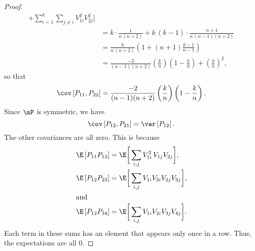 \begin{proof}
\begin{align*}
                  + \sum_{i=1}^k
                    \sum_{j\neq i} V_{1i}^2 V_{2j}^2
              \bigg] \\
        &= k \cdot \frac{1}{ n \, (n+2) }
           + k \, (k-1) \cdot \frac{ n+1 }{ n \, (n-1) (n+2) } \\
        &= \frac{k}{ n \, (n+2) }
           \left( 1 + (n+1) \frac{k-1}{n-1} \right) \\
        &= \frac{-2}{(n-1)(n+2)}
           \left(\frac{k}{n}\right) \left( 1 - \frac{k}{n} \right)
           + \left( \frac{k}{n} \right)^2,
    \end{align*}
    so that
    \[
        \cov \left[ P_{11}, P_{22} \right]
        = \frac{-2}{ (n-1) (n+2) }
           \left(\frac{k}{n}\right) \left( 1 - \frac{k}{n} \right).
    \]
    Since $\mP$ is symmetric, we have
    \[
        \cov \left[ P_{12}, P_{21} \right]
        = \var \left[ P_{12} \right].
    \]
    The other covariances are all zero.  This is because
    \begin{align*}
        \E \left[ P_{11} P_{12} \right]
        &= \E \bigg[ 
                  \sum_{i,j} V_{1i}^2 \, V_{1j}  V_{2j} 
              \bigg], \\
        \E \left[ P_{12} P_{23} \right]
        &= \E \bigg[ 
                \sum_{i,j} V_{1i} V_{2i} V_{2j} V_{3j}
              \bigg], \\
    \intertext{and}
        \E \left[ P_{12} P_{34} \right]
        &= \E \bigg[ 
                \sum_{i,j} V_{1i} V_{2i} V_{3j} V_{4j}
              \bigg].
    \end{align*}
    Each term in these sums has an element that appears only once in a row.
    Thus, the expectations are all $0$.
\end{proof}

